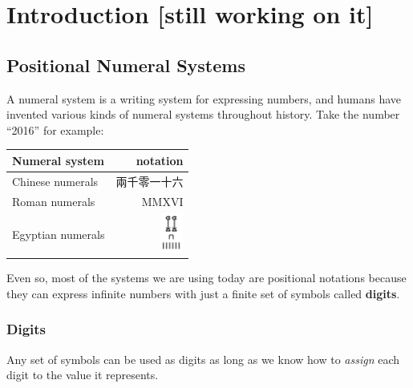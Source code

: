 \documentclass[../thesis.tex]{subfiles}
\begin{document}
\graphicspath{ {images/}{../images/} }

\chapter{Introduction [still working on it]}\label{introduction}

\section{Positional Numeral Systems}

A numeral system is a writing system for expressing numbers, and humans have
invented various kinds of numeral systems throughout history.
Take the number ``2016'' for example:

\begin{center}
    \begin{tabular}{ | l | r | }
    \textbf{Numeral system} & \textbf{notation}  \\
    \hline
    Chinese numerals    & 兩千零一十六    \\
    Roman numerals      & MMXVI         \\
    Egyptian numerals   & \includegraphics[width=2em]{egyptian/2016.png} \\
    \end{tabular}
\end{center}

Even so, most of the systems we are using today are positional notations\cite{knuth1998art}
because they can express infinite numbers with just a finite set of symbols called \textbf{digits}.

\subsection{Digits}

Any set of symbols can be used as digits as long as we know how to \textit{assign}
each digit to the value it represents.
\end{document}
